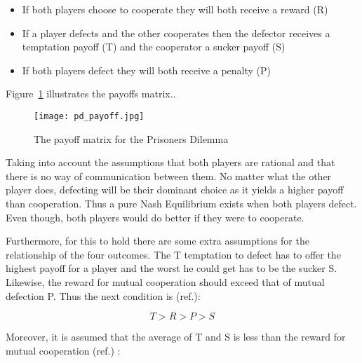 \begin{itemize}
  \item If both players choose to cooperate they will both receive a reward (R)
  \item If a player defects and the other cooperates then the defector receives
  a temptation payoff (T) and the cooperator a sucker payoff (S)
  \item If both players defect they will both receive a penalty (P)
\end{itemize}

Figure~\ref{fig:pd_payoff} illustrates the payoffs matrix..

\begin{figure}[h!]
    \centering
    \texttt{[image: pd\_payoff.jpg]}
    \caption{The payoff matrix for the Prisoners Dilemma \parencite{Li2011}}
    \label{fig:pd_payoff}
\end{figure}

Taking into account the assumptions that both players are rational
and that there is no way of communication between them. No matter what the
other player does, defecting will be their dominant choice as it yields a higher
payoff than cooperation.
Thus a pure Nash Equilibrium exists when both players defect. Even though, both
players would do better if they were to cooperate.

Furthermore, for this to hold there are some extra assumptions for the
relationship of the four outcomes. The T temptation to defect has to offer the
highest payoff for a player and the worst he could get has to be the sucker S.
Likewise, the reward for mutual cooperation should exceed that of mutual
defection P. Thus the next condition is (ref.):

\begin{equation}
 T > R > P > S
\end{equation}

Moreover, it is assumed that the average of T and S is less than the reward for
mutual cooperation (ref.) :

